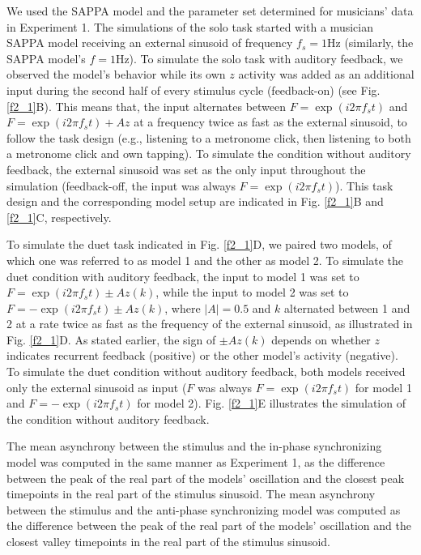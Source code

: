 \documentclass{report}
\begin{document}
We used the SAPPA model and the parameter set determined for musicians' data in Experiment 1. The simulations of the solo task started with a musician SAPPA model receiving an external sinusoid of frequency $f_s = 1$Hz (similarly, the SAPPA model's $f = 1$Hz). To simulate the solo task with auditory feedback, we observed the model's behavior while its own $z$ activity was added as an additional input during the second half of every stimulus cycle (feedback-on) (see Fig.{} \ref{f2_1}B). This means that, the input alternates between $F = \exp(i2\pi f_s t)$ and $F = \exp(i2\pi f_s t) + Az$ at a frequency twice as fast as the external sinusoid, to follow the task design (e.g., listening to a metronome click, then listening to both a metronome click and own tapping). To simulate the condition without auditory feedback, the external sinusoid was set as the only input throughout the simulation (feedback-off, the input was always $F = \exp(i2\pi f_s t)$). This task design and the corresponding model setup are indicated in Fig.{} \ref{f2_1}B and \ref{f2_1}C, respectively.

To simulate the duet task indicated in Fig.{} \ref{f2_1}D, we paired two models, of which one was referred to as model 1 and the other as model 2. To simulate the duet condition with auditory feedback, the input to model 1 was set to $F = \exp(i2\pi f_s t) \pm Az(k)$, while the input to model 2 was set to $F = -\exp(i2\pi f_s t) \pm Az(k)$, where $|A| = 0.5$ and $k$ alternated between 1 and 2 at a rate twice as fast as the frequency of the external sinusoid, as illustrated in Fig.{} \ref{f2_1}D. As stated earlier, the sign of $\pm Az(k)$ depends on whether $z$ indicates recurrent feedback (positive) or the other model's activity (negative). To simulate the duet condition without auditory feedback, both models received only the external sinusoid as input ($F$ was always $F = \exp(i2\pi f_s t)$ for model 1 and $F = -\exp(i2\pi f_s t)$ for model 2). Fig.{} \ref{f2_1}E illustrates the simulation of the condition without auditory feedback.

The mean asynchrony between the stimulus and the in-phase synchronizing model was computed in the same manner as Experiment 1, as the difference between the peak of the real part of the models' oscillation and the closest peak timepoints in the real part of the stimulus sinusoid. The mean asynchrony between the stimulus and the anti-phase synchronizing model was computed as the difference between the peak of the real part of the models' oscillation and the closest valley timepoints in the real part of the stimulus sinusoid.
\end{document}

